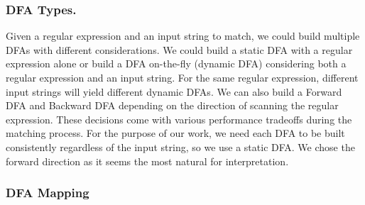 \subsubsection{DFA Types.} Given a regular expression and an input string to match, we could build multiple DFAs with different considerations. We could build a static DFA with a regular expression alone or build a DFA on-the-fly (dynamic DFA) considering both a regular expression and an input string. For the same regular expression, different input strings will yield different dynamic DFAs. We can also build a Forward DFA and Backward DFA depending on the direction of scanning the regular expression. These decisions come with various performance tradeoffs during the matching process. 
For the purpose of our work, we need each DFA to be built consistently regardless of the input string, so we use a static DFA. We chose the forward direction 
as it seems the most natural for interpretation.

\subsubsection{DFA Mapping} 
\label{dfamapping}




%  

